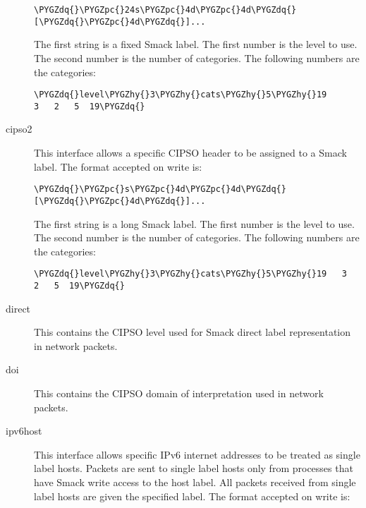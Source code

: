 \documentclass[a4paper,8pt,english]{sphinxmanual}
\def\PYGZpc{\char`\%}
\def\PYGZhy{\char`\-}
\def\PYGZdq{\char`\"}
\begin{document}
\begin{description}
\begin{Verbatim}[commandchars=\\\{\}]
\PYGZdq{}\PYGZpc{}24s\PYGZpc{}4d\PYGZpc{}4d\PYGZdq{}[\PYGZdq{}\PYGZpc{}4d\PYGZdq{}]...
\end{Verbatim}

The first string is a fixed Smack label. The first number is
the level to use. The second number is the number of categories.
The following numbers are the categories:

\begin{Verbatim}[commandchars=\\\{\}]
\PYGZdq{}level\PYGZhy{}3\PYGZhy{}cats\PYGZhy{}5\PYGZhy{}19          3   2   5  19\PYGZdq{}
\end{Verbatim}

\item[{cipso2}] \leavevmode
This interface allows a specific CIPSO header to be assigned
to a Smack label. The format accepted on write is:

\begin{Verbatim}[commandchars=\\\{\}]
\PYGZdq{}\PYGZpc{}s\PYGZpc{}4d\PYGZpc{}4d\PYGZdq{}[\PYGZdq{}\PYGZpc{}4d\PYGZdq{}]...
\end{Verbatim}

The first string is a long Smack label. The first number is
the level to use. The second number is the number of categories.
The following numbers are the categories:

\begin{Verbatim}[commandchars=\\\{\}]
\PYGZdq{}level\PYGZhy{}3\PYGZhy{}cats\PYGZhy{}5\PYGZhy{}19   3   2   5  19\PYGZdq{}
\end{Verbatim}

\item[{direct}] \leavevmode
This contains the CIPSO level used for Smack direct label
representation in network packets.

\item[{doi}] \leavevmode
This contains the CIPSO domain of interpretation used in
network packets.

\item[{ipv6host}] \leavevmode
This interface allows specific IPv6 internet addresses to be
treated as single label hosts. Packets are sent to single
label hosts only from processes that have Smack write access
to the host label. All packets received from single label hosts
are given the specified label. The format accepted on write is:


\end{description}
\end{document}
